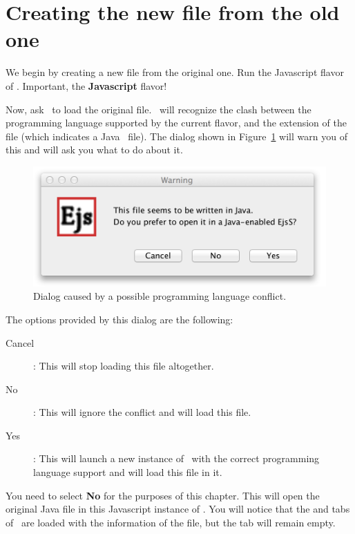     \section{Creating the new file from the old one}\label{section:04Creating}

We begin by creating a new  file from the original  one. Run the Javascript flavor of \ejs. Important, the \textbf{Javascript} flavor!

Now, ask \ejs\ to load the original  file. \ejs\ will recognize the clash between the programming language supported by the current flavor, and the  extension of the file (which indicates a Java \ejs\ file). The dialog shown in Figure~\ref{fig:04JavatoJS/FlavorDetection} will warn you of this and will ask you what to do about it.

\begin{figure}[htb]
  \centering
  \includegraphics[scale=\scale]{04JavatoJS/images/FlavorDetection.png}
  \caption{Dialog caused by a possible programming language conflict.}
  \label{fig:04JavatoJS/FlavorDetection}
\end{figure}

\noindent The options provided by this dialog are the following:
\begin{description}
  \item[Cancel]: This will stop loading this file altogether.
  \item[No]: This will ignore the conflict and will load this file.
  \item[Yes]: This will launch a new instance of \ejs\ with the correct programming language support and will load this file in it.
\end{description}

You need to select \textbf{No} for the purposes of this chapter. This will open the original Java file in this Javascript instance of \ejs. You will notice that the  and  tabs of \ejs\ are loaded with the information of the  file, but the  tab will remain empty.

